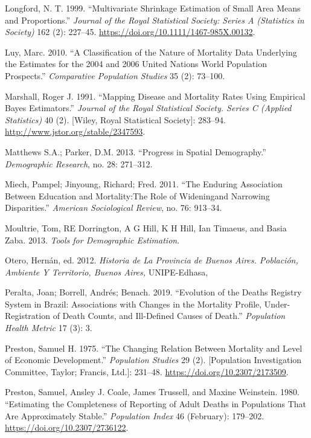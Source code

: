 \documentclass[12pt,]{article}
\begin{document}
\leavevmode\hypertarget{ref-Longford1999}{}%
Longford, N. T. 1999. ``Multivariate Shrinkage Estimation of Small Area
Means and Proportions.'' \emph{Journal of the Royal Statistical Society:
Series A (Statistics in Society)} 162 (2): 227--45.
\url{https://doi.org/10.1111/1467-985X.00132}.

\leavevmode\hypertarget{ref-Luy2010}{}%
Luy, Marc. 2010. ``A Classification of the Nature of Mortality Data
Underlying the Estimates for the 2004 and 2006 United Nations World
Population Prospects.'' \emph{Comparative Population Studies} 35 (2):
73--100.

\leavevmode\hypertarget{ref-Marshall1991}{}%
Marshall, Roger J. 1991. ``Mapping Disease and Mortality Rates Using
Empirical Bayes Estimators.'' \emph{Journal of the Royal Statistical
Society. Series C (Applied Statistics)} 40 (2). {[}Wiley, Royal
Statistical Society{]}: 283--94.
\url{http://www.jstor.org/stable/2347593}.

\leavevmode\hypertarget{ref-Matthews2013}{}%
Matthews S.A.; Parker, D.M. 2013. ``Progress in Spatial Demography.''
\emph{Demographic Research}, no. 28: 271--312.

\leavevmode\hypertarget{ref-Miech2011}{}%
Miech, Pampel; Jinyoung, Richard; Fred. 2011. ``The Enduring Association
Between Education and Mortality:The Role of Wideningand Narrowing
Disparities.'' \emph{American Sociological Review}, no. 76: 913--34.

\leavevmode\hypertarget{ref-Moultrie}{}%
Moultrie, Tom, RE Dorrington, A G Hill, K H Hill, Ian Timaeus, and Basia
Zaba. 2013. \emph{Tools for Demographic Estimation}.

\leavevmode\hypertarget{ref-Otero2012}{}%
Otero, Hernán, ed. 2012. \emph{Historia de La Provincia de Buenos Aires.
Población, Ambiente Y Territorio, Buenos Aires,} UNIPE-Edhasa,

\leavevmode\hypertarget{ref-Peralta2019}{}%
Peralta, Joan; Borrell, Andrés; Benach. 2019. ``Evolution of the Deaths
Registry System in Brazil: Associations with Changes in the Mortality
Profile, Under-Registration of Death Counts, and Ill-Defined Causes of
Death.'' \emph{Population Health Metric} 17 (3): 3.

\leavevmode\hypertarget{ref-Preston1975}{}%
Preston, Samuel H. 1975. ``The Changing Relation Between Mortality and
Level of Economic Development.'' \emph{Population Studies} 29 (2).
{[}Population Investigation Committee, Taylor; Francis, Ltd.{]}:
231--48. \url{https://doi.org/10.2307/2173509}.

\leavevmode\hypertarget{ref-Preston1980}{}%
Preston, Samuel, Ansley J. Coale, James Trussell, and Maxine Weinstein.
1980. ``Estimating the Completeness of Reporting of Adult Deaths in
Populations That Are Approximately Stable.'' \emph{Population Index} 46
(February): 179--202. \url{https://doi.org/10.2307/2736122}.
\end{document}
